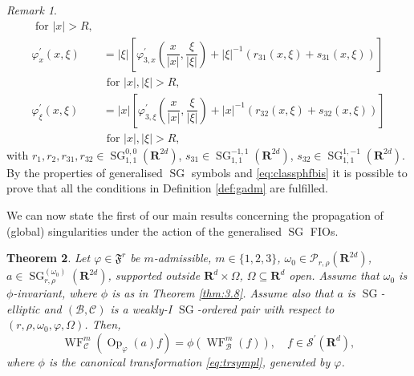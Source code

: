 \documentclass[12pt,a4paper,reqno]{amsart}
\numberwithin{equation}{section}
\newtheorem{thm}{Theorem}
\numberwithin{thm}{section}
\theoremstyle{definition}
\theoremstyle{remark}
\newtheorem{rem}[thm]{Remark}
\begin{document}
\begin{rem}
\begin{equation}
\begin{aligned}
		\text{ for $|x|>R$},
	\\[1ex]
		\varphi^\prime_x(x,\xi)&=
		|\xi|\left[\varphi^\prime_{3,x}\left(\dfrac{x}{|x|},\dfrac{\xi}{|\xi|}\right)
		+
		           |\xi|^{-1}(r_{31}(x,\xi)+s_{31}(x,\xi))\right]
		           \\
		&\text{ for $|x|,|\xi|>R$},
	\\[1ex]
		\varphi^\prime_\xi(x,\xi)&=
		|x|\left[\varphi^\prime_{3,\xi}\left(\dfrac{x}{|x|},\dfrac{\xi}{|\xi|}\right)
		+
		          |x|^{-1}(r_{32}(x,\xi)+s_{32}(x,\xi))\right]
		          \\
		&\text{ for $|x|,|\xi|>R$},
	\end{aligned}
\end{equation}
with $r_1,r_2,r_{31},r_{32}\in{\operatorname{SG}}^{0,0}_{1,1}({\mathbf R^{{2d}}})$, $s_{31}\in{\operatorname{SG}}^{-1,1}_{1,1}({\mathbf R^{{2d}}})$,
$s_{32}\in{\operatorname{SG}}^{1,-1}_{1,1}({\mathbf R^{{2d}}})$. By the properties of generalised ${\operatorname{SG}}$ symbols and \eqref{eq:classphfbis} it is possible to prove that all the conditions in Definition \ref{def:gadm} are fulfilled.
\end{rem}

\par

We can now state the first of our main results concerning the propagation of (global)
singularities under the action of the generalised ${\operatorname{SG}}$ FIOs.

\par

\begin{thm}
\label{thm:3.22}
Let $\varphi\in{\mathfrak{F}^r}$ be $m$-admissible, $m\in\{1,2,3 \}$, 
$\omega_0\in \mathscr P_{r,\rho}({\mathbf R^{{2d}}})$, 
$a\in{\operatorname{SG}}^{(\omega_0)}_{r,\rho}({\mathbf R^{{2d}}})$, supported
outside ${\mathbf R^{{d}}}\times\Omega$,
$\Omega\subseteq{\mathbf R^{{d}}}$ open. Assume that $\omega_0$ is $\phi$-invariant, 
where $\phi$ is as in Theorem \ref{thm:3.8}.
Assume also that $a$ is ${\operatorname{SG}}$-elliptic
and $({{\mathcal B}} ,{{\mathcal C}} )$ is a weakly-I ${\operatorname{SG}}$-ordered pair with respect to
$(r,\rho ,\omega _0,\varphi ,\Omega )$.
Then,
\begin{equation}
\label{eq:3.72.8}
{\operatorname{WF}}^{m}_{{\mathcal C}}({\operatorname{Op}}_\varphi(a)f) = \phi({\operatorname{WF}}^{m}_{{\mathcal B}}(f)),\quad f
\in \mathscr{S}^\prime({\mathbf R^{{d}}}),
\end{equation}
where $\phi$ is the canonical transformation \eqref{eq:trsympl}, generated by $\varphi$.
\end{thm}
\end{document}
